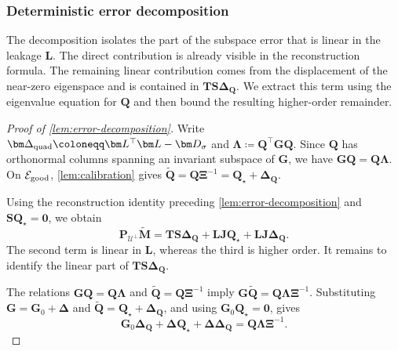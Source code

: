 \documentclass[11pt]{article}
\newcommand{\trans}{\top}
\newcommand{\cU}{\mathcal{U}}
\newcommand{\cE}{\mathcal{E}}
\newcommand{\bze}{\bm{0}}
\begin{document}
\subsubsection{Deterministic error decomposition}
\label{app:error-decomposition}

The decomposition isolates the part of the subspace error that is linear in
the leakage $\bm L$. The direct contribution is already visible in the
reconstruction formula. The remaining linear contribution comes from the
displacement of the near-zero eigenspace and is contained in
$\bm T\bm S\bm\Delta_{\bm Q}$. We extract this term using the eigenvalue
equation for $\bm Q$ and then bound the resulting higher-order remainder.

\begin{proof}[Proof of \cref{lem:error-decomposition}]
Write
$\bm\Delta_{\rm quad}\coloneqq\bm L^\trans\bm L-\bm D_\sigma$ and
$\bm\Lambda\coloneqq\bm Q^\trans\bm G\bm Q$. Since $\bm Q$ has
orthonormal columns spanning an invariant subspace of $\bm G$, we have
$\bm G\bm Q=\bm Q\bm\Lambda$. On $\cE_{\rm good}$,
\cref{lem:calibration} gives
$\widetilde{\bm Q}
=\bm Q\bm\Xi^{-1}
=\bm Q_\star+\bm\Delta_{\bm Q}$.

Using the reconstruction identity preceding
\cref{lem:error-decomposition} and
$\bm S\bm Q_\star=\bze$, we obtain
\begin{equation}
\label{eq:error-proof-start}
  \bm P_{\cU^\perp}\widetilde{\bm M}
  =
  \bm T\bm S\bm\Delta_{\bm Q}
  +
  \bm L\bm J\bm Q_\star
  +
  \bm L\bm J\bm\Delta_{\bm Q}.
\end{equation}
The second term is linear in $\bm L$, whereas the third is higher order.
It remains to identify the linear part of
$\bm T\bm S\bm\Delta_{\bm Q}$.

The relations
$\bm G\bm Q=\bm Q\bm\Lambda$ and
$\widetilde{\bm Q}=\bm Q\bm\Xi^{-1}$ imply
$\bm G\widetilde{\bm Q}
=\bm Q\bm\Lambda\bm\Xi^{-1}$.
Substituting
$\bm G=\bm G_0+\bm\Delta$ and
$\widetilde{\bm Q}=\bm Q_\star+\bm\Delta_{\bm Q}$, and using
$\bm G_0\bm Q_\star=\bze$, gives
\begin{equation}
\label{eq:aligned-invariance}
  \bm G_0\bm\Delta_{\bm Q}
  +
  \bm\Delta\bm Q_\star
  +
  \bm\Delta\bm\Delta_{\bm Q}
  =
  \bm Q\bm\Lambda\bm\Xi^{-1}.
\end{equation}


\end{proof}
\end{document}
